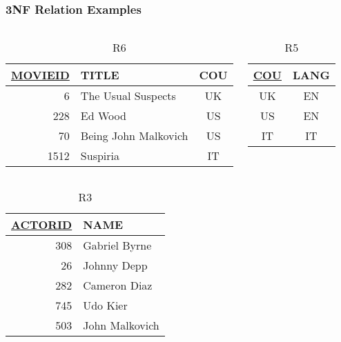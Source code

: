 \documentclass[dvipsnames]{beamer}
\begin{document}
\begin{frame}[label=example_db_3]
  \frametitle{3NF Relation Examples}

  \vspace{-24pt}
  \begin{columns}[t]
    \begin{footnotesize}
    \begin{table}
      \caption{R6}
      \begin{tabular}{|r|l|c|}\hline
\underline{MOVIEID} & TITLE    & COU\\[2pt]\hline\hline
      6 & The Usual Suspects   & UK \\\hline
    228 & Ed Wood              & US \\\hline
     70 & Being John Malkovich & US \\\hline
   1512 & Suspiria             & IT \\\hline
      \end{tabular}
    \end{table}
    \end{footnotesize}

    \begin{footnotesize}
    \begin{table}
      \caption{R5}
      \begin{tabular}{|c|c|}\hline
\underline{COU} & LANG\\[2pt]\hline\hline
UK & EN\\\hline
US & EN\\\hline
IT & IT\\\hline
      \end{tabular}
    \end{table}
    \end{footnotesize}
  \end{columns}

  \vspace{-24pt}
  \begin{columns}[t]
    \begin{footnotesize}
    \begin{table}
      \caption{R3}
      \begin{tabular}{|r|l|}\hline
\underline{ACTORID} & NAME\\[2pt]\hline\hline
      308 & Gabriel Byrne \\\hline
       26 & Johnny Depp   \\\hline
      282 & Cameron Diaz  \\\hline
      745 & Udo Kier      \\\hline
      503 & John Malkovich\\\hline
      \end{tabular}
    \end{table}
    \end{footnotesize}


\end{columns}
\end{frame}
\end{document}
